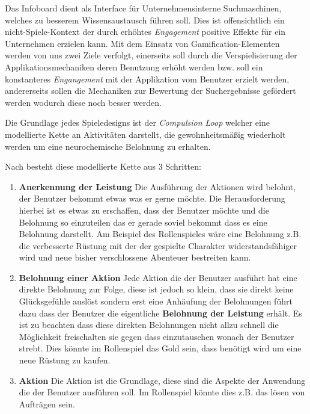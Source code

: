 \documentclass[12pt,twoside]{book}
\begin{document}
Das Infoboard dient als Interface für Unternehmensinterne Suchmaschinen, welches zu besserem Wissensaustausch führen soll. Dies ist offensichtlich ein nicht-Spiele-Kontext der durch erhöhtes \textit{Engagement} positive Effekte für ein Unternehmen erzielen kann.
Mit dem Einsatz von Gamification-Elementen werden von uns zwei Ziele verfolgt, einerseits soll durch die Verspielisierung der Applikationsmechaniken deren Benutzung erhöht werden bzw. soll ein konstanteres \textit{Engangement} mit der Applikation vom Benutzer erzielt werden, andererseits sollen die Mechaniken zur Bewertung der Suchergebnisse gefördert werden wodurch diese noch besser werden.


Die Grundlage jedes Spieledesigns ist der \textit{Compulsion Loop} welcher eine modellierte Kette an Aktivitäten darstellt, die gewohnheitsmäßig wiederholt werden um eine neurochemische Belohnung zu erhalten.

Nach \citep{gamasutra} besteht diese modellierte Kette aus 3 Schritten:

\begin{enumerate}
  \item \textbf{Anerkennung der Leistung} Die Ausführung der Aktionen wird belohnt, der Benutzer bekommt etwas was er gerne möchte. Die Herausforderung hierbei ist es etwas zu erschaffen, dass der Benutzer möchte und die Belohnung so einzuteilen das er gerade soviel bekommt dass es eine Belohnung darstellt. Am Beispiel des Rollenspieles wäre eine Belohnung z.B. die verbesserte Rüstung mit der der gespielte Charakter widerstandsfähiger wird und neue bisher verschlossene Abenteuer bestreiten kann.
  \item \textbf{Belohnung einer Aktion} Jede Aktion die der Benutzer ausführt hat eine direkte Belohnung zur Folge, diese ist jedoch so klein, dass sie direkt keine Glücksgefühle auslöst sondern erst eine Anhäufung der Belohnungen führt dazu dass der Benutzer die eigentliche \textbf{Belohnung der Leistung} erhält. Es ist zu beachten dass diese direkten Belohnungen nicht allzu schnell die Möglichkeit freischalten sie gegen dass einzutauschen wonach der Benutzer strebt. Dies könnte im Rollenspiel das Gold sein, dass benötigt wird um eine neue Rüstung zu kaufen.
  \item \textbf{Aktion} Die Aktion ist die Grundlage, diese sind die Aspekte der Anwendung die der Benutzer ausführen soll. Im Rollenspiel könnte dies z.B. das lösen von Aufträgen sein.
\end{enumerate}
\end{document}
